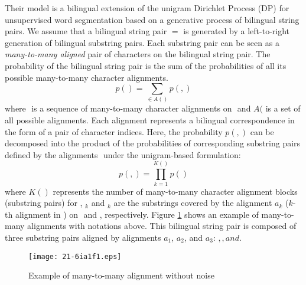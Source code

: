 \documentclass[english]{jnlp_1.4}
\def\pair#1#2{}
\def\subpair#1#2{}
\newcommand{\svec}[1]{}
\begin{document}
Their model is a bilingual extension of the unigram Dirichlet Process (DP)
for unsupervised word segmentation \cite{goldwater:2006:colacl,xu:2008:coling}
based on a generative process of bilingual string pairs.
We assume that a bilingual string pair $\pair{\svec{s}}{\svec{t}} = \pair{s_1 \ldots s_{|\svec{s}|}}{t_1 \ldots t_{|\svec{t}|}}$ is generated
by a left-to-right generation of bilingual substring pairs.
Each substring pair can be seen as a {\em many-to-many aligned} pair of characters on the bilingual string pair.
The probability of the bilingual string pair
is the sum of the probabilities of all its possible many-to-many character alignments.
\begin{equation}
p(\pair{\svec{s}}{\svec{t}})
 = \sum_{\svec{a} \in A(\pair{\svec{s}}{\svec{t}})} p(\pair{\svec{s}}{\svec{t}}, \svec{a})
   \label{eqn:prob_base}
\end{equation}
where {$\svec{a}$} is a sequence of many-to-many character alignments on {$\pair{\svec{s}}{\svec{t}}$}
and {$A(\pair{\svec{s}}{\svec{t})}$} is a set of all possible alignments.
Each alignment represents a bilingual correspondence in the form of a pair of character indices.
Here, the probability {$p(\pair{\svec{s}}{\svec{t}}, \svec{a})$} can be decomposed into
the product of the probabilities of corresponding substring pairs defined by the alignments {$\svec{a}$} under the unigram-based formulation:
\begin{equation}
p(\pair{\svec{s}}{\svec{t}}, \svec{a})
 = \prod_{k=1}^{K(\svec{a})} p(\subpair{\svec{\sigma}_k}{\svec{\tau}_k})
   \label{eqn:prob}
\end{equation}
where {$K(\svec{a})$} represents the number of many-to-many character alignment blocks (substring pairs) for {$\svec{a}$},
{$\svec{\sigma}_k$} and {$\svec{\tau}_k$} are the substrings covered by the alignment {$a_k$} ($k$-th alignment in {$\svec{a}$})
on {$\svec{s}$} and {$\svec{t}$}, respectively.
Figure \ref{fig:notation} shows an example of many-to-many alignments with notations above.
This bilingual string pair is composed of three substring pairs aligned by alignments {$a_1$}, {$a_2$}, and {$a_3$}:
{$\subpair{\text{フォー}}{\text{fo}}, \subpair{\text{カ}}{\text{cu}}, and \subpair{\text{ス}}{\text{s}}$}.

\begin{figure}[b]
\begin{center}
\texttt{[image: 21-6ia1f1.eps]}
\end{center}
\caption{Example of many-to-many alignment without noise}
\label{fig:notation}
\end{figure}
\end{document}
